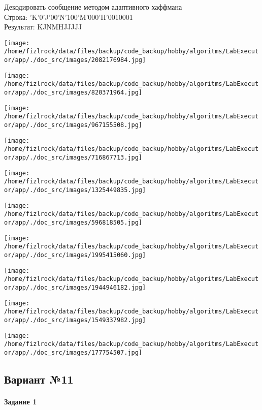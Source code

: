 \documentclass[a4paper, 12pt]{article}
\begin{document}
Декодировать сообщение методом адаптивного хаффмана \\
Строка: 
'K'0'J'00'N'100'M'000'H'0010001\\
Результат: KJNMHJJJJJ

\texttt{[image: /home/fizlrock/data/files/backup/code\_backup/hobby/algoritms/LabExecutor/app/./doc\_src/images/2082176984.jpg]}

\texttt{[image: /home/fizlrock/data/files/backup/code\_backup/hobby/algoritms/LabExecutor/app/./doc\_src/images/820371964.jpg]}

\texttt{[image: /home/fizlrock/data/files/backup/code\_backup/hobby/algoritms/LabExecutor/app/./doc\_src/images/967155508.jpg]}

\texttt{[image: /home/fizlrock/data/files/backup/code\_backup/hobby/algoritms/LabExecutor/app/./doc\_src/images/716867713.jpg]}

\texttt{[image: /home/fizlrock/data/files/backup/code\_backup/hobby/algoritms/LabExecutor/app/./doc\_src/images/1325449835.jpg]}

\texttt{[image: /home/fizlrock/data/files/backup/code\_backup/hobby/algoritms/LabExecutor/app/./doc\_src/images/596818505.jpg]}

\texttt{[image: /home/fizlrock/data/files/backup/code\_backup/hobby/algoritms/LabExecutor/app/./doc\_src/images/1995415060.jpg]}

\texttt{[image: /home/fizlrock/data/files/backup/code\_backup/hobby/algoritms/LabExecutor/app/./doc\_src/images/1944946182.jpg]}

\texttt{[image: /home/fizlrock/data/files/backup/code\_backup/hobby/algoritms/LabExecutor/app/./doc\_src/images/1549337982.jpg]}

\texttt{[image: /home/fizlrock/data/files/backup/code\_backup/hobby/algoritms/LabExecutor/app/./doc\_src/images/177754507.jpg]}
\pagebreak
\subsection{Вариант №11}
\paragraph{Задание 1}
\end{document}
